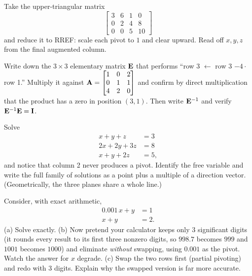 \begin{exercise}
Take the upper-triangular matrix
\[
\left[\begin{array}{ccc|c}
3 & 6 & 1 & 0\\
0 & 2 & 4 & 8\\
0 & 0 & 5 & 10
\end{array}\right]
\]
and reduce it to RREF: scale each pivot to $1$ and clear upward. Read off
$x,y,z$ from the final augmented column.
\end{exercise}

\begin{exercise}
Write down the $3\times 3$ elementary matrix $\mathbf{E}$ that performs ``row 3
$\leftarrow$ row 3 $-4\cdot$ row 1.'' Multiply it against
$\mathbf{A}=\begin{bmatrix}1&0&2\\0&1&1\\4&2&0\end{bmatrix}$ and confirm by direct multiplication that
the product has a zero in position $(3,1)$. Then write $\mathbf{E}^{-1}$ and verify
$\mathbf{E}^{-1}\mathbf{E}=\mathbf{I}$.
\end{exercise}

\begin{exercise}
Solve
\[
\begin{aligned}
x + y + z &= 3\\
2x + 2y + 3z &= 8\\
x + y + 2z &= 5,
\end{aligned}
\]
and notice that column 2 never produces a pivot. Identify the free variable and
write the full family of solutions as a point plus a multiple of a direction
vector. (Geometrically, the three planes share a whole line.)
\end{exercise}

\begin{exercise}
Consider, with exact arithmetic,
\[
\begin{aligned}
0.001\,x + y &= 1\\
x + y &= 2.
\end{aligned}
\]
(a) Solve exactly. (b) Now pretend your calculator keeps only $3$ significant
digits (it rounds every result to its first three nonzero digits, so $998.7$
becomes $999$ and $1001$ becomes $1000$) and eliminate \emph{without} swapping,
using $0.001$ as the pivot.
Watch the answer for $x$ degrade. (c) Swap the two rows first (partial pivoting)
and redo with $3$ digits. Explain why the swapped version is far more accurate.
\end{exercise}

